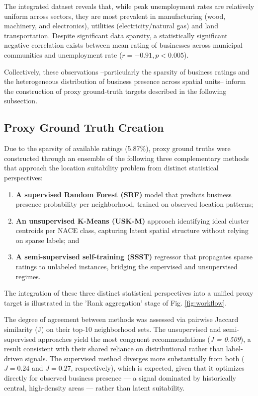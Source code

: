 \documentclass[pdflatex,sn-mathphys-num]{sn-jnl}%
\theoremstyle{thmstyleone}%
\theoremstyle{thmstyletwo}%
\theoremstyle{thmstylethree}%
\begin{document}
The integrated dataset reveals that, while peak unemployment rates are relatively uniform across sectors, they are most prevalent in manufacturing (wood, machinery, and electronics), utilities (electricity/natural gas) and land transportation. Despite significant data sparsity, a statistically significant negative correlation exists between mean rating of businesses across municipal communities and unemployment rate ($r = -0.91, p < 0.005$).

Collectively, these observations --particularly the sparsity of business ratings and the heterogeneous distribution of business presence across spatial units-- inform the construction of proxy ground-truth targets described in the following subsection.

\subsection{Proxy Ground Truth Creation}

Due to the sparsity of available ratings (5.87\%), proxy ground truths were constructed through an ensemble of the following three complementary methods that approach the location suitability problem from distinct statistical perspectives: 
\begin{enumerate}
    \item \textbf{A supervised Random Forest (SRF)} model that predicts business presence probability per neighborhood, trained on observed location patterns;
    \item \textbf{An unsupervised K-Means (USK-M)} approach identifying ideal cluster centroids per NACE class, capturing latent spatial structure without relying on sparse labels; and
    \item \textbf{A semi-supervised self-training (SSST)} regressor that propagates sparse ratings to unlabeled instances, bridging the supervised and unsupervised regimes.
\end{enumerate}

The integration of these three distinct statistical perspectives into a unified proxy target is illustrated in the 'Rank aggregation' stage of Fig. \ref{fig:workflow}.

The degree of agreement between methods was assessed via pairwise Jaccard similarity (J) on their top-10 neighborhood sets. The unsupervised and semi-supervised approaches yield the most congruent recommendations (\emph{J = 0.509}), a result consistent with their shared reliance on distributional rather than label-driven signals. The supervised method diverges more substantially from both (\emph{$J = 0.24$} and \emph{$J = 0.27$}, respectively), which is expected, given that it optimizes directly for observed business presence — a signal dominated by historically central, high-density areas — rather than latent suitability. 
\end{document}
